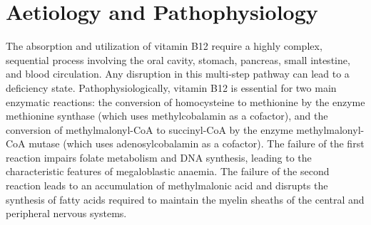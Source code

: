 \section*{Aetiology and Pathophysiology}
The absorption and utilization of vitamin B12 require a highly complex, sequential process involving the oral cavity, stomach, pancreas, small intestine, and blood circulation. Any disruption in this multi-step pathway can lead to a deficiency state. Pathophysiologically, vitamin B12 is essential for two main enzymatic reactions: the conversion of homocysteine to methionine by the enzyme methionine synthase (which uses methylcobalamin as a cofactor), and the conversion of methylmalonyl-CoA to succinyl-CoA by the enzyme methylmalonyl-CoA mutase (which uses adenosylcobalamin as a cofactor). The failure of the first reaction impairs folate metabolism and DNA synthesis, leading to the characteristic features of megaloblastic anaemia. The failure of the second reaction leads to an accumulation of methylmalonic acid and disrupts the synthesis of fatty acids required to maintain the myelin sheaths of the central and peripheral nervous systems.

